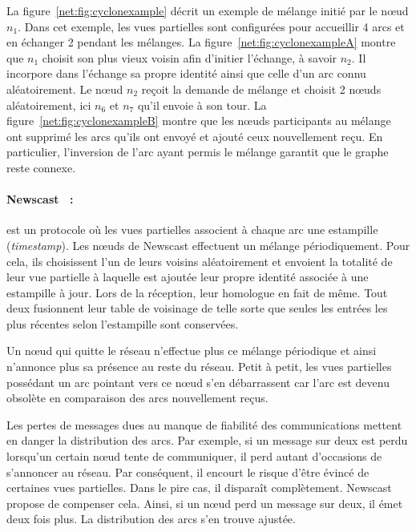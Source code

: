 \noindent La figure~\ref{net:fig:cyclonexample} décrit un exemple de mélange
initié par le nœud $n_1$. Dans cet exemple, les vues partielles sont configurées
pour accueillir 4 arcs et en échanger 2 pendant les mélanges. La
figure~\ref{net:fig:cyclonexampleA} montre que $n_1$ choisit son plus vieux
voisin afin d'initier l'échange, à savoir $n_2$. Il incorpore dans l'échange sa
propre identité ainsi que celle d'un arc connu aléatoirement. Le nœud $n_2$
reçoit la demande de mélange et choisit 2 nœuds aléatoirement, ici $n_6$ et
$n_7$ qu'il envoie à son tour. La figure~\ref{net:fig:cyclonexampleB} montre que
les nœuds participants au mélange ont supprimé les arcs qu'ils ont envoyé et
ajouté ceux nouvellement reçu. En particulier, l'inversion de l'arc ayant permis
le mélange garantit que le graphe reste connexe.

\paragraph{Newscast~\cite{tolgyeski2009adaptive} :} est un protocole où les vues
partielles associent à chaque arc une estampille
(\emph{timestamp}). Les nœuds de Newscast effectuent un mélange
périodiquement. Pour cela, ils choisissent l'un de leurs voisins aléatoirement et
envoient la totalité de leur vue partielle à laquelle est ajoutée leur propre
identité associée à une estampille à jour. Lors de la réception, leur homologue
en fait de même. Tout deux fusionnent leur table de voisinage de telle sorte que
seules les entrées les plus récentes selon l'estampille sont conservées.

\noindent Un nœud qui quitte le réseau n'effectue plus ce mélange périodique et
ainsi n'annonce plus sa présence au reste du réseau. Petit à petit, les vues
partielles possédant un arc pointant vers ce nœud s'en débarrassent car l'arc
est devenu obsolète en comparaison des arcs nouvellement reçus.

\noindent Les pertes de messages dues au manque de fiabilité des communications
mettent en danger la distribution des arcs. Par exemple, si un message sur deux
est perdu lorsqu'un certain nœud tente de communiquer, il perd autant
d'occasions de s'annoncer au réseau. Par conséquent, il encourt le risque d'être
évincé de certaines vues partielles. Dans le pire cas, il disparaît
complètement. Newscast propose de compenser cela. Ainsi, si un nœud perd un
message sur deux, il émet deux fois plus. La distribution des arcs s'en trouve
ajustée.

